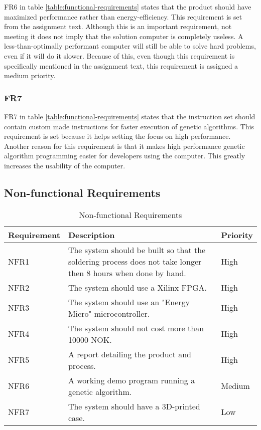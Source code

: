FR6 in table \vref{table:functional-requirements} states that the product should have maximized performance rather than energy-efficiency.
This requirement is set from the assignment text.
Although this is an important requirement, not meeting it does not imply that the solution computer is completely useless.
A less-than-optimally performant computer will still be able to solve hard problems, even if it will do it slower.
Because of this, even though this requirement is specifically mentioned in the assignment text, this requirement is assigned a medium priority.

\subsubsection{FR7}

FR7 in table \vref{table:functional-requirements} states that the instruction set should contain custom made instructions for faster execution of genetic algorithms.
This requirement is set because it helps setting the focus on high performance.
Another reason for this requirement is that it makes high performance genetic algorithm programming easier for developers using the computer.
This greatly increases the usability of the computer.

\subsection{Non-functional Requirements}

\begin{table}[H]
\begin{center}
\begin{tabular}{| l | p{7cm} | l |}
\hline
Requirement & Description & Priority \\
\hline
NFR1 & The system should be built so that the soldering process does not take longer then 8 hours when done by hand. & High \\
NFR2 & The system should use a Xilinx FPGA. & High\\
NFR3 & The system should use an "Energy Micro" microcontroller. & High \\
NFR4 & The system should not cost more than 10000 NOK. & High \\
NFR5 & A report detailing the product and process. & High \\
NFR6 & A working demo program running a genetic algorithm. & Medium \\
NFR7 & The system should have a 3D-printed case. & Low \\
\hline
\end{tabular}
\caption{Non-functional Requirements}
\label{table:non-functional-requirements}
\end{center}
\end{table}

